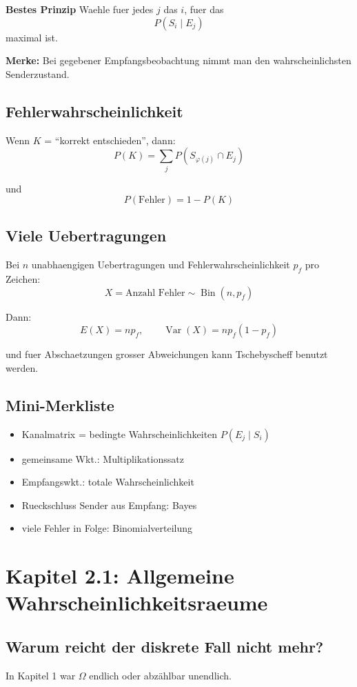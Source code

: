 \documentclass[a4paper,11pt]{article}
\begin{document}
\textbf{Bestes Prinzip}
Waehle fuer jedes $j$ das $i$, fuer das
\[
P(S_i\mid E_j)
\]
maximal ist.

\textbf{Merke:}
Bei gegebener Empfangsbeobachtung nimmt man den wahrscheinlichsten Senderzustand.

\subsection{Fehlerwahrscheinlichkeit}
Wenn $K$ = ``korrekt entschieden'', dann:
\[
P(K)=\sum_j P(S_{\varphi(j)}\cap E_j)
\]

und
\[
P(\text{Fehler})=1-P(K)
\]

\subsection{Viele Uebertragungen}
Bei $n$ unabhaengigen Uebertragungen und Fehlerwahrscheinlichkeit $p_f$ pro Zeichen:
\[
X=\text{Anzahl Fehler}
\sim \operatorname{Bin}(n,p_f)
\]

Dann:
\[
E(X)=np_f,\qquad \operatorname{Var}(X)=np_f(1-p_f)
\]

und fuer Abschaetzungen grosser Abweichungen kann Tschebyscheff benutzt werden.

\subsection{Mini-Merkliste}
\begin{itemize}
  \item Kanalmatrix = bedingte Wahrscheinlichkeiten $P(E_j\mid S_i)$
  \item gemeinsame Wkt.: Multiplikationssatz
  \item Empfangswkt.: totale Wahrscheinlichkeit
  \item Rueckschluss Sender aus Empfang: Bayes
  \item viele Fehler in Folge: Binomialverteilung
\end{itemize}

\section{Kapitel 2.1: Allgemeine Wahrscheinlichkeitsraeume}

\subsection{Warum reicht der diskrete Fall nicht mehr?}
In Kapitel 1 war $\Omega$ endlich oder abz\"ahlbar unendlich.
\end{document}
